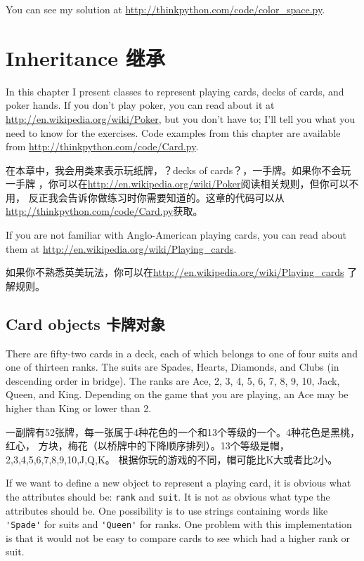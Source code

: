 \documentclass[10pt]{book}
\begin{document}
\begin{CJK}{UTF8}{gbsn}
\begin{exercise}
\begin{enumerate}
\end{enumerate}

You can see my solution at \url{http://thinkpython.com/code/color_space.py}.

\end{exercise}


\chapter{Inheritance 继承}

In this chapter I present classes to represent playing cards,
decks of cards, and poker hands.  If you don't play poker, you can
read about it at \url{http://en.wikipedia.org/wiki/Poker}, but you don't have
to; I'll tell you what you need to know for the exercises.
Code examples from this chapter are available from
\url{http://thinkpython.com/code/Card.py}.

在本章中，我会用类来表示玩纸牌，？decks of cards？，一手牌。如果你不会玩一手牌
，你可以在\url{http://en.wikipedia.org/wiki/Poker}阅读相关规则，但你可以不用，
反正我会告诉你做练习时你需要知道的。这章的代码可以从
\url{http://thinkpython.com/code/Card.py}获取。

If you are not familiar with Anglo-American playing cards,
you can read about them at \url{http://en.wikipedia.org/wiki/Playing_cards}.

如果你不熟悉英美玩法，你可以在\url{http://en.wikipedia.org/wiki/Playing_cards}
了解规则。


\section{Card objects 卡牌对象}

There are fifty-two cards in a deck, each of which belongs to one of
four suits and one of thirteen ranks.  The suits are Spades, Hearts,
Diamonds, and Clubs (in descending order in bridge).  The ranks are
Ace, 2, 3, 4, 5, 6, 7, 8, 9, 10, Jack, Queen, and King.  Depending on
the game that you are playing, an Ace may be higher than King
or lower than 2.

一副牌有52张牌，每一张属于4种花色的一个和13个等级的一个。4种花色是黑桃，红心，
方块，梅花（以桥牌中的下降顺序排列）。13个等级是帽，2,3,4,5,6,7,8,9,10,J,Q,K。
根据你玩的游戏的不同，帽可能比K大或者比2小。

If we want to define a new object to represent a playing card, it is
obvious what the attributes should be: {\tt rank} and
{\tt suit}.  It is not as obvious what type the attributes
should be.  One possibility is to use strings containing words like
\verb"'Spade'" for suits and \verb"'Queen'" for ranks.  One problem with
this implementation is that it would not be easy to compare cards to
see which had a higher rank or suit.


\end{CJK}
\end{document}
